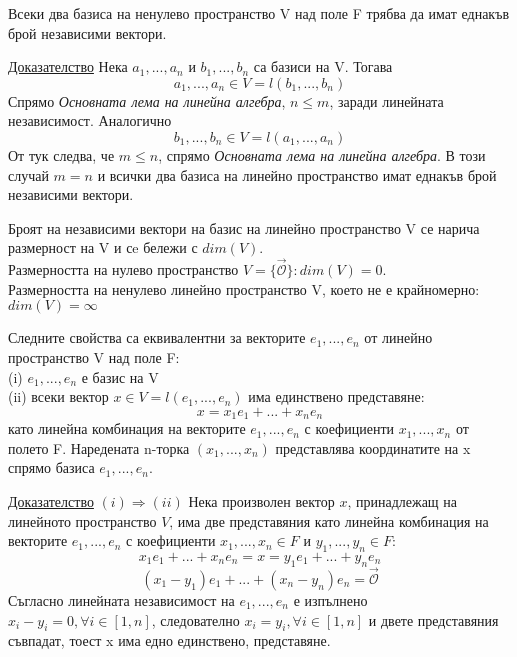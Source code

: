 \documentclass{article}
\newcommand*{\nullvec}{\vec{\mathcal{O}}}
\begin{document}
\begin{tcolorbox}[title = Твърдение 5.5, colframe = blue!70!black, colback = blue!10!white]
    Всеки два базиса на ненулево пространство V над поле F трябва да имат еднакъв брой независими вектори.
\end{tcolorbox}
\underline{Доказателство} Нека $a_1,...,a_n$ и $b_1,...,b_n$ са базиси на V. Тогава
\[
    a_1,...,a_n \in V = l(b_1,...,b_n)
\]
Спрямо \emph{Основната лема на линейна алгебра}, $n\leq m$, заради линейната независимост. Аналогично
\[
    b_1,...,b_n \in V = l(a_1,...,a_n)
\]
От тук следва, че $m\leq n$, спрямо \emph{Основната лема на линейна алгебра}. В този случай $m=n$ и
всички два базиса на линейно пространство имат еднакъв брой независими вектори.

\begin{tcolorbox}[title = Определение 5.6, colframe = red!70!black, colback = red!10!white]
    Броят на независими вектори на базис на линейно пространство V се нарича размерност на V и сe
    бележи с $dim(V)$. \\
    Размерността на нулево пространство $V=\{\nullvec\}: dim(V)=0$.\\
    Размерността на ненулево линейно пространство V, което не е крайномерно: $dim(V)=\infty$
\end{tcolorbox}

\begin{tcolorbox}[title = Твърдение 5.7, colframe = blue!70!black, colback = blue!10!white]
    Следните свойства са еквивалентни за векторите $e_1,...,e_n$ от линейно пространство V над поле F:\\
    (i) $e_1,...,e_n$ е базис на V\\
    (ii) всеки вектор $x\in V=l(e_1,...,e_n)$ има единствено представяне:
    \[
        x=x_1e_1+...+x_ne_n
    \]
    като линейна комбинация на векторите $e_1,...,e_n$ с коефициенти $x_1,...,x_n$ от полето F.
    Наредената n-торка $(x_1,...,x_n)$ представлява координатите на x спрямо базиса $e_1,...,e_n$.
\end{tcolorbox}

\underline{Доказателство} $(i)\Rightarrow(ii)$ Нека произволен вектор $x$, принадлежащ на
линейното пространство $V$, има две представяния като линейна комбинация на векторите
$e_1,...,e_n$ с коефициенти $x_1,...,x_n\in F$ и $y_1,...,y_n\in F$:
\[
    x_1e_1+...+x_ne_n=x=y_1e_1+...+y_ne_n
\]
\[
    (x_1-y_1)e_1+...+(x_n-y_n)e_n=\nullvec
\]
Съгласно линейната независимост на $e_1,...,e_n$ е изпълнено $x_i-y_i=0, \forall i\in[1,n]$,
следователно $x_i=y_i, \forall i\in[1,n]$ и двете представяния съвпадат, тоест x има едно единствено,
представяне.
\end{document}

